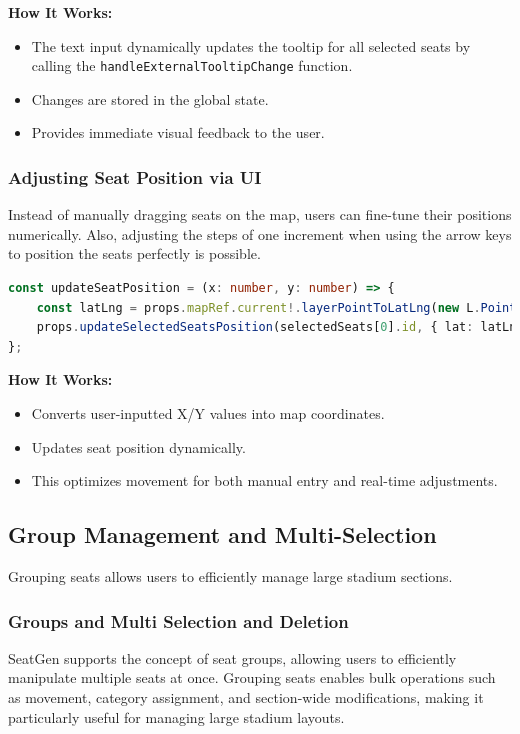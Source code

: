 \textbf{How It Works:}
\begin{itemize}
    \item The text input dynamically updates the tooltip for all selected seats by calling the \texttt{handleExternalTooltipChange} function.
    \item Changes are stored in the global state.
    \item Provides immediate visual feedback to the user.
\end{itemize}

\subsubsection{Adjusting Seat Position via UI}
Instead of manually dragging seats on the map, users can fine-tune their positions numerically. Also, adjusting the steps of one increment when using the arrow keys to position the seats perfectly is possible.

\begin{lstlisting}[language=TypeScript, caption=Updating Seat Coordinates, label=lst:update-seat-position]
const updateSeatPosition = (x: number, y: number) => {
    const latLng = props.mapRef.current!.layerPointToLatLng(new L.Point(x, y));
    props.updateSelectedSeatsPosition(selectedSeats[0].id, { lat: latLng.lat, lng: latLng.lng }, true);
};
\end{lstlisting}

\textbf{How It Works:}
\begin{itemize}
    \item Converts user-inputted X/Y values into map coordinates.
    \item Updates seat position dynamically.
    \item This optimizes movement for both manual entry and real-time adjustments.
\end{itemize}

\subsection{Group Management and Multi-Selection}
Grouping seats allows users to efficiently manage large stadium sections.
\subsubsection{Groups and Multi Selection and Deletion}

SeatGen supports the concept of seat groups, allowing users to efficiently manipulate multiple seats at once. Grouping seats enables bulk operations such as movement, category assignment, and section-wide modifications, making it particularly useful for managing large stadium layouts.

